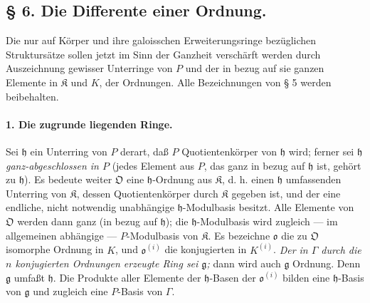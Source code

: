 \subsection*{\S{} 6. Die Differente einer Ordnung.}

Die nur auf Körper und ihre galoisschen Erweiterungsringe bezüglichen Struktursätze sollen jetzt im Sinn der Ganzheit verschärft werden durch Auszeichnung gewisser Unterringe von $P$ und der in bezug auf sie ganzen Elemente in $\mathfrak K$ und $K$, der Ordnungen. Alle Bezeichnungen von § 5 werden beibehalten.

\paragraph{1. Die zugrunde liegenden Ringe.}
Sei $\mathfrak h$ ein Unterring von $P$ derart, daß $P$ Quotientenkörper von $\mathfrak h$ wird; ferner sei $\mathfrak h$ \emph{ganz-abgeschlossen in $P$} (jedes Element aus $P$, das ganz in bezug auf $\mathfrak h$ ist, gehört zu $\mathfrak h$). Es bedeute weiter $\mathfrak O$ eine $\mathfrak h$-Ordnung aus $\mathfrak K$, d. h. einen $\mathfrak h$ umfassenden Unterring von $\mathfrak K$, dessen Quotientenkörper durch $\mathfrak K$ gegeben ist, und der eine endliche, nicht notwendig unabhängige $\mathfrak h$-Modulbasis besitzt. Alle Elemente von $\mathfrak O$ werden dann ganz (in bezug auf $\mathfrak h$); die $\mathfrak h$-Modulbasis wird zugleich --- im allgemeinen abhängige --- $P$-Modulbasis von $\mathfrak K$. Es bezeichne $\mathfrak o$ die zu $\mathfrak O$ isomorphe Ordnung in $K$, und $\mathfrak o^{(i)}$ die konjugierten in $K^{(i)}$. \emph{Der in $\Gamma$ durch die $n$ konjugierten Ordnungen erzeugte Ring sei $\mathfrak g$;} dann wird auch $\mathfrak g$ Ordnung. Denn $\mathfrak g$ umfaßt $\mathfrak h$. Die Produkte aller Elemente der $\mathfrak h$-Basen der $\mathfrak o^{(i)}$ bilden eine $\mathfrak h$-Basis von $\mathfrak g$ und zugleich eine $P$-Basis von $\Gamma$.

